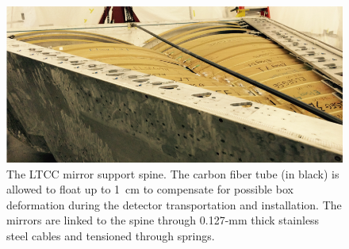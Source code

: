 \begin{figure}[b]
	\centering
	\includegraphics[width=1.0\columnwidth,keepaspectratio]{img/spine.png}
	\caption{The LTCC mirror support spine. The carbon fiber tube (in black) is allowed to float up to 1~cm to
          compensate for possible box deformation during the detector transportation and installation. The mirrors
          are linked to the spine through 0.127-mm thick stainless steel cables and tensioned through springs.}
	\label{fig:spine}
\end{figure}
